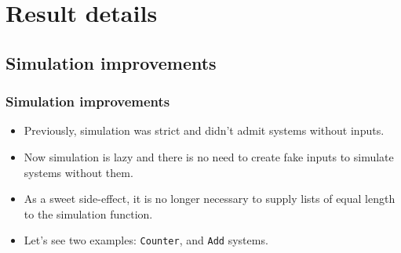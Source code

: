 \documentclass{beamer}
\begin{document}
\section{Result details}

\subsection{Simulation improvements}

\begin{frame}
  \frametitle{Simulation improvements}
  \begin{itemize}
  \item
  Previously, simulation was strict and didn't admit systems without inputs.
   \pause
  \item
    Now simulation is lazy and there is no need to create fake inputs to
simulate systems without them.
  \item As a sweet side-effect, it is no longer necessary to supply
    lists of equal length to the simulation function.
  \pause
  \item
  Let's see two examples: \texttt{Counter}, and \texttt{Add} systems.
 
\end{itemize}

\end{frame}
\end{document}
